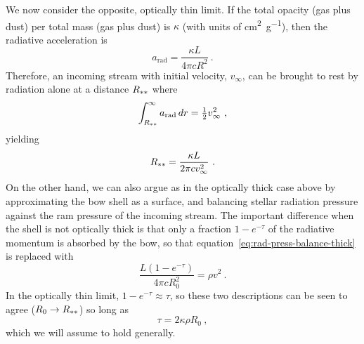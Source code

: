 We now consider the opposite, optically thin limit.  If the total
opacity (gas plus dust) per total mass (gas plus dust) is \(\kappa\) (with
units of \si{cm^2.g^{-1}}), then the radiative acceleration is
\begin{equation}
  \label{eq:rad-accel}
  a_{\text{rad}} = \frac{\kappa L}{4 \pi c R^2} \ .
\end{equation}
Therefore, an incoming stream with initial velocity, \(v_\infty\), can be
brought to rest by radiation alone at a distance \(R_{**}\) where
\begin{equation}
  \label{eq:rad-poten}
  \int_{R\starstar}^\infty a_{\text{rad}} \, dr = \tfrac12 v_\infty^2 \ , 
\end{equation}
yielding
\begin{equation}
  \label{eq:rad:R0}
  R_{**} = \frac{\kappa L}{2\pi c v_\infty^2} \ .
\end{equation}
On the other hand, we can also argue as in the optically thick case
above by approximating the bow shell as a surface, and balancing
stellar radiation pressure against the ram pressure of the incoming
stream.  The important difference when the shell is not optically
thick is that only a fraction \(1 - e^{-\tau}\) of the radiative momentum
is absorbed by the bow, so that
equation~\eqref{eq:rad-press-balance-thick} is replaced with
\begin{equation}
  \label{eq:rad-press-balance-tau}
  \frac{L (1 - e^{-\tau})}{4 \pi c R_0^2} = \rho v^2 \ .
\end{equation}
In the optically thin limit, \(1 - e^{-\tau} \approx \tau\), so these two
descriptions can be seen to agree (\(R_0 \to R_{**}\)) so long as
\begin{equation}
  \label{eq:tau-thin}
  \tau = 2 \kappa \rho R_0 \ ,
\end{equation}
which we will assume to hold generally.

